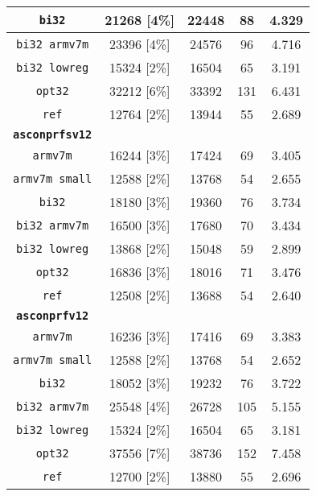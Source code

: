 \begin{table}[h]
\begin{adjustbox}{width=245pt}
\begin{tabular}{|c|c|c|c|c|}
        \hline
        \texttt{bi32} & 21268 [4\%] & 22448 & 88 & 4.329 \\
        \hline
        \texttt{bi32 armv7m} & 23396 [4\%] & 24576 & 96 & 4.716 \\
        \hline
        \texttt{bi32 lowreg} & 15324 [2\%] & 16504 & 65 & 3.191 \\
        \hline
        \texttt{opt32} & 32212 [6\%] & 33392 & 131 & 6.431 \\
        \hline
        \texttt{ref} & 12764 [2\%] & 13944 & 55 & 2.689 \\
        \hline
        \texttt{\textbf{asconprfsv12}} & & & & \\
        \hline
        \texttt{armv7m} & 16244 [3\%] & 17424 & 69 & 3.405 \\
        \hline
        \texttt{armv7m small} & 12588 [2\%] & 13768 & 54 & 2.655 \\
        \hline
        \texttt{bi32} & 18180 [3\%] & 19360 & 76 & 3.734 \\ 
        \hline
        \texttt{bi32 armv7m} & 16500 [3\%] & 17680 & 70 & 3.434 \\
        \hline
        \texttt{bi32 lowreg} & 13868 [2\%] & 15048 & 59 & 2.899 \\
        \hline
        \texttt{opt32} & 16836 [3\%] & 18016 & 71 & 3.476 \\
        \hline
        \texttt{ref} & 12508 [2\%] & 13688 & 54 & 2.640 \\
        \hline
        \texttt{\textbf{asconprfv12}} & & & & \\
        \hline
        \texttt{armv7m} & 16236 [3\%] & 17416 & 69 & 3.383 \\
        \hline
        \texttt{armv7m small} & 12588 [2\%] & 13768 & 54 & 2.652 \\
        \hline
        \texttt{bi32} & 18052 [3\%] & 19232 & 76 & 3.722 \\ 
        \hline
        \texttt{bi32 armv7m} & 25548 [4\%] & 26728 & 105 & 5.155 \\
        \hline
        \texttt{bi32 lowreg} & 15324 [2\%] & 16504 & 65 & 3.181 \\
        \hline
        \texttt{opt32} & 37556 [7\%] & 38736 & 152 & 7.458 \\
        \hline
        \texttt{ref} & 12700 [2\%] & 13880 & 55 & 2.696 \\
        \hline
    \end{tabular}
    \end{adjustbox}
\end{table}

